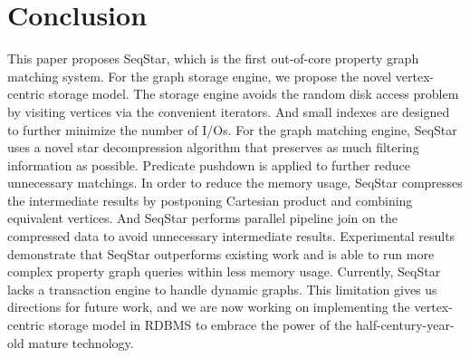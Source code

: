 \section{Conclusion}\label{sec:conclusion}
This paper proposes SeqStar, which is the first out-of-core property graph matching system.
For the graph storage engine, we propose the novel vertex-centric storage model.
The storage engine avoids the random disk access problem by visiting vertices via the convenient iterators.
And small indexes are designed to further minimize the number of I/Os.
For the graph matching engine,
SeqStar uses a novel star decompression algorithm that preserves as much filtering information as possible.
Predicate pushdown is applied to further reduce unnecessary matchings.
In order to reduce the memory usage, SeqStar compresses the intermediate results by postponing Cartesian product and combining equivalent vertices.
And SeqStar performs parallel pipeline join on the compressed data to avoid unnecessary intermediate results.
Experimental results demonstrate that SeqStar outperforms existing work and is able to run more complex property graph queries within less memory usage.
Currently, SeqStar lacks a transaction engine to handle dynamic graphs.
This limitation gives us directions for future work,
and we are now working on implementing the vertex-centric storage model in RDBMS to embrace the power of the half-century-year-old mature technology.
